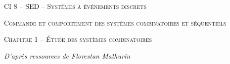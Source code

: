 \documentclass[11pt,oneside]{article}
\begin{document}
\pagestyle{fancy}
\renewcommand{\headrulewidth}{0pt}

\fancyhead{}

\fancyhead[C]{\rule{12cm}{.5pt}}


\renewcommand{\footrulewidth}{0.2pt}

\fancyfoot[C]{\footnotesize{\bfseries \thepage}}



\begin{center}
 \huge\textsc{CI 8 -- SED -- Systèmes à événements discrets}

 \large\textsc{Commande et comportement des systèmes combinatoires et séquentiels}
\end{center}

\begin{center}
 \LARGE\textsc{Chapitre 1 -- Étude des systèmes combinatoires}
\end{center}


\vspace{.5cm}
\begin{flushright}
\textit{D'après ressources de Florestan Mathurin}
\end{flushright}
\end{document}
